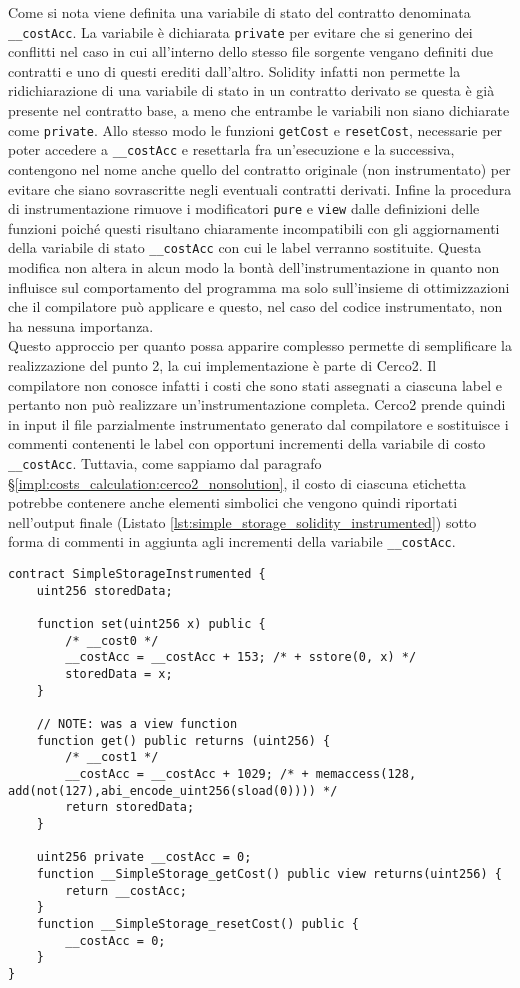 \documentclass[12pt,a4paper,openright,oneside]{report}
\theoremstyle{definition}
\begin{document}
Come si nota viene definita una variabile di stato del contratto denominata \texttt{\_\_costAcc}. La variabile \`{e} dichiarata \texttt{private} per evitare che si generino dei conflitti nel caso in cui all'interno dello stesso file sorgente vengano definiti due contratti e uno di questi erediti dall'altro. Solidity infatti non permette la ridichiarazione di una variabile di stato in un contratto derivato se questa \`{e} gi\`{a} presente nel contratto base, a meno che entrambe le variabili non siano dichiarate come \texttt{private}. Allo stesso modo le funzioni \texttt{getCost} e \texttt{resetCost}, necessarie per poter accedere a \texttt{\_\_costAcc} e resettarla fra un'esecuzione e la successiva, contengono nel nome anche quello del contratto originale (non instrumentato) per evitare che siano sovrascritte negli eventuali contratti derivati. Infine la procedura di instrumentazione rimuove i modificatori \texttt{pure} e \texttt{view} dalle definizioni delle funzioni poich\'{e} questi risultano chiaramente incompatibili con gli aggiornamenti della variabile di stato \texttt{\_\_costAcc} con cui le label verranno sostituite. Questa modifica non altera in alcun modo la bont\`{a} dell'instrumentazione in quanto non influisce sul comportamento del programma ma solo sull'insieme di ottimizzazioni che il compilatore pu\`{o} applicare e questo, nel caso del codice instrumentato, non ha nessuna importanza. \\
Questo approccio per quanto possa apparire complesso permette di semplificare la realizzazione del punto 2, la cui implementazione \`{e} parte di Cerco2. Il compilatore non conosce infatti i costi che sono stati assegnati a ciascuna label e pertanto non pu\`{o} realizzare un'instrumentazione completa. Cerco2 prende quindi in input il file parzialmente instrumentato generato dal compilatore e sostituisce i commenti contenenti le label con opportuni incrementi della variabile di costo \texttt{\_\_costAcc}. Tuttavia, come sappiamo dal paragrafo \S\ref{impl:costs_calculation:cerco2_nonsolution}, il costo di ciascuna etichetta potrebbe contenere anche elementi simbolici che vengono quindi riportati nell'output finale (Listato \ref{lst:simple_storage_solidity_instrumented}) sotto forma di commenti in aggiunta agli incrementi della variabile \texttt{\_\_costAcc}.
\begin{lstlisting}[language=Solidity,caption=Instrumentazione di \ref{lst:simple_storage_solidity},label={lst:simple_storage_solidity_instrumented},frame=tlrb]
contract SimpleStorageInstrumented {
    uint256 storedData;

    function set(uint256 x) public {
        /* __cost0 */
        __costAcc = __costAcc + 153; /* + sstore(0, x) */
        storedData = x;
    }

    // NOTE: was a view function
    function get() public returns (uint256) {
        /* __cost1 */
        __costAcc = __costAcc + 1029; /* + memaccess(128, add(not(127),abi_encode_uint256(sload(0)))) */
        return storedData;
    }
    
    uint256 private __costAcc = 0;
    function __SimpleStorage_getCost() public view returns(uint256) {
        return __costAcc;
    }
    function __SimpleStorage_resetCost() public {
        __costAcc = 0;
    }
}
\end{lstlisting}
\end{document}
